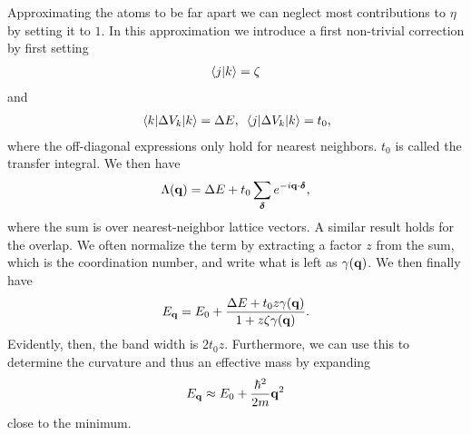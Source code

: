 Approximating the atoms to be far apart we can neglect most contributions to $\eta$ by setting it to $1$. In this approximation we introduce a first non-trivial correction by first setting
\begin{align*}
	\braket{j}{k} = \zeta
\end{align*}
and
\begin{align*}
	\expval{\Delta V_{k}}{k} = \Delta E,\ \mel{j}{\Delta V_{k}}{k} = t_{0},
\end{align*}
where the off-diagonal expressions only hold for nearest neighbors. $t_{0}$ is called the transfer integral. We then have
\begin{align*}
	\Lambda(\vb{q}) = \Delta E + t_{0}\sum\limits_{\vb*{\delta}}e^{-i\vb{q}\cdot\vb*{\delta}},
\end{align*}
where the sum is over nearest-neighbor lattice vectors. A similar result holds for the overlap. We often normalize the term by extracting a factor $z$ from the sum, which is the coordination number, and write what is left as $\gamma(\vb{q})$. We then finally have
\begin{align*}
	E_{\vb{q}} = E_{0} + \frac{\Delta E + t_{0}z\gamma(\vb{q})}{1 + z\zeta\gamma(\vb{q})}.
\end{align*}
Evidently, then, the band width is $2t_{0}z$. Furthermore, we can use this to determine the curvature and thus an effective mass by expanding
\begin{align*}
	E_{\vb{q}} \approx E_{0} + \frac{\hbar^{2}}{2m}\vb{q}^{2}
\end{align*}
close to the minimum.


